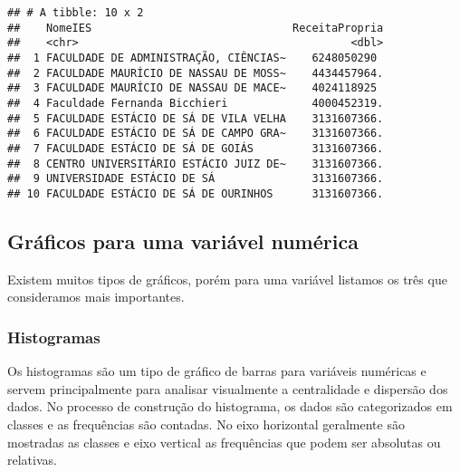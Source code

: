 \documentclass[12pt,]{style/krantz}
\makeatletter
\newenvironment{Shaded}{\begin{snugshade}}{\end{snugshade}}
\newcommand{\KeywordTok}[1]{\textcolor[rgb]{0.13,0.29,0.53}{\textbf{#1}}}
\newcommand{\DataTypeTok}[1]{\textcolor[rgb]{0.13,0.29,0.53}{#1}}
\newcommand{\DecValTok}[1]{\textcolor[rgb]{0.00,0.00,0.81}{#1}}
\newcommand{\StringTok}[1]{\textcolor[rgb]{0.31,0.60,0.02}{#1}}
\newcommand{\OperatorTok}[1]{\textcolor[rgb]{0.81,0.36,0.00}{\textbf{#1}}}
\newcommand{\NormalTok}[1]{#1}
\newenvironment{kframe}{%
\medskip{}
\setlength{\fboxsep}{.8em}
 \def\at@end@of@kframe{}%
 \ifinner\ifhmode%
  \def\at@end@of@kframe{\end{minipage}}%
  \begin{minipage}{\columnwidth}%
 \fi\fi%
 \def\FrameCommand##1{\hskip\@totalleftmargin \hskip-\fboxsep
 \colorbox{shadecolor}{##1}\hskip-\fboxsep
     \hskip-\linewidth \hskip-\@totalleftmargin \hskip\columnwidth}%
 \MakeFramed {\advance\hsize-\width
   \@totalleftmargin\z@ \linewidth\hsize
   \@setminipage}}%
 {\par\unskip\endMakeFramed%
 \at@end@of@kframe}
\renewenvironment{Shaded}{\begin{kframe}}{\end{kframe}}
\theoremstyle{definition}
\theoremstyle{definition}
\theoremstyle{definition}
\theoremstyle{remark}
\makeatother
\begin{document}
\begin{Shaded}
\end{Shaded}

\begin{verbatim}
## # A tibble: 10 x 2
##    NomeIES                               ReceitaPropria
##    <chr>                                          <dbl>
##  1 FACULDADE DE ADMINISTRAÇÃO, CIÊNCIAS~    6248050290 
##  2 FACULDADE MAURÍCIO DE NASSAU DE MOSS~    4434457964.
##  3 FACULDADE MAURÍCIO DE NASSAU DE MACE~    4024118925 
##  4 Faculdade Fernanda Bicchieri             4000452319.
##  5 FACULDADE ESTÁCIO DE SÁ DE VILA VELHA    3131607366.
##  6 FACULDADE ESTÁCIO DE SÁ DE CAMPO GRA~    3131607366.
##  7 FACULDADE ESTÁCIO DE SÁ DE GOIÁS         3131607366.
##  8 CENTRO UNIVERSITÁRIO ESTÁCIO JUIZ DE~    3131607366.
##  9 UNIVERSIDADE ESTÁCIO DE SÁ               3131607366.
## 10 FACULDADE ESTÁCIO DE SÁ DE OURINHOS      3131607366.
\end{verbatim}

\subsection{Gráficos para uma variável
numérica}\label{graficos-para-uma-variavel-numerica}

Existem muitos tipos de gráficos, porém para uma variável listamos os
três que consideramos mais importantes.

\subsubsection{Histogramas}\label{histogramas}

Os histogramas são um tipo de gráfico de barras para variáveis numéricas
e servem principalmente para analisar visualmente a centralidade e
dispersão dos dados. No processo de construção do histograma, os dados
são categorizados em classes e as frequências são contadas. No eixo
horizontal geralmente são mostradas as classes e eixo vertical as
frequências que podem ser absolutas ou relativas.
\end{document}
